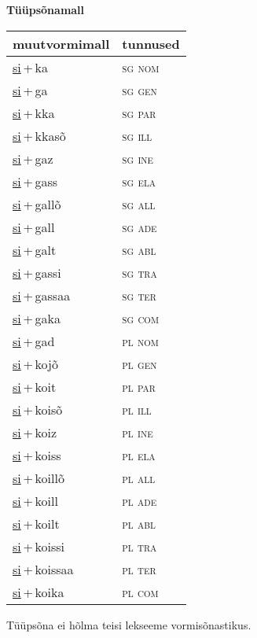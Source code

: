 
\vspace{1.8em}
\begin{minipage}{\textwidth}
\textbf{Tüüpsõnamall \,}\\

\begin{sideways}
\begin{tabular}{l l}
muutvormimall & tunnused \\
\hline
\underline{si}\,+\,ka & \textsc{ sg nom } \\
\underline{si}\,+\,ga & \textsc{ sg gen } \\
\underline{si}\,+\,kka & \textsc{ sg par } \\
\underline{si}\,+\,kkasõ & \textsc{ sg ill } \\
\underline{si}\,+\,gaz & \textsc{ sg ine } \\
\underline{si}\,+\,gass & \textsc{ sg ela } \\
\underline{si}\,+\,gallõ & \textsc{ sg all } \\
\underline{si}\,+\,gall & \textsc{ sg ade } \\
\underline{si}\,+\,galt & \textsc{ sg abl } \\
\underline{si}\,+\,gassi & \textsc{ sg tra } \\
\underline{si}\,+\,gassaa & \textsc{ sg ter } \\
\underline{si}\,+\,gaka & \textsc{ sg com } \\
\underline{si}\,+\,gad & \textsc{ pl nom } \\
\underline{si}\,+\,kojõ & \textsc{ pl gen } \\
\underline{si}\,+\,koit & \textsc{ pl par } \\
\underline{si}\,+\,koisõ & \textsc{ pl ill } \\
\underline{si}\,+\,koiz & \textsc{ pl ine } \\
\underline{si}\,+\,koiss & \textsc{ pl ela } \\
\underline{si}\,+\,koillõ & \textsc{ pl all } \\
\underline{si}\,+\,koill & \textsc{ pl ade } \\
\underline{si}\,+\,koilt & \textsc{ pl abl } \\
\underline{si}\,+\,koissi & \textsc{ pl tra } \\
\underline{si}\,+\,koissaa & \textsc{ pl ter } \\
\underline{si}\,+\,koika & \textsc{ pl com } \\
\end{tabular}
\end{sideways}
\label{tab:tüüpsõnamall-sika}

\end{minipage}

 
\vspace{1em}
\noindent Tüüpsõna ei hõlma teisi lekseeme vormi\-sõnastikus.
